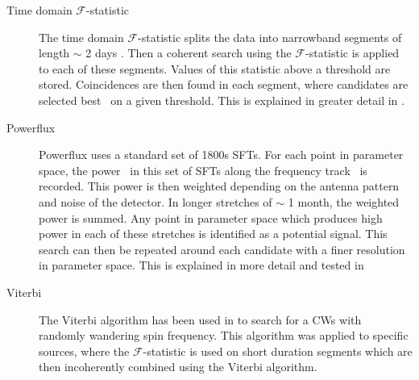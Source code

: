 \begin{description}
        \item[Time domain $\mathcal{F}$-statistic] The time domain
$\mathcal{F}$-statistic splits the data into narrowband segments of length
$\sim$ 2 days \citep{walsh2016ComparisonMethods}. Then a coherent search using
the $\mathcal{F}$-statistic is applied to each of these segments. Values of
this statistic above a threshold are stored. Coincidences are then found in
each segment, where candidates are selected best~ on a given
threshold. This is explained in greater detail in
\citep{aasi2014ImplementationTextdollar,walsh2016ComparisonMethods}.
	
        \item[Powerflux] Powerflux uses a standard set of 1800s \glspl{SFT}.
For each point in parameter space, the power~ in this set
of \glspl{SFT} along the frequency track~ is
recorded. This power is then weighted depending on the antenna pattern and
noise of the detector. In longer stretches of $\sim$ 1 month, the weighted
power is summed. Any point in parameter space which produces high power in each
of these stretches is identified as a potential signal. This search can then be
repeated around each candidate with a finer resolution in parameter space. This
is explained in more detail and tested in
\citep{abadie2012AllskySearch,walsh2016ComparisonMethods,ligoscientificcollaborationandvirgocollaboration2016ComprehensiveAllsky}
	
        \item[Viterbi] The Viterbi algorithm \citep{viterbi1967ErrorBounds} has
been used in \citep{sun2018HiddenMarkov,
suvorova2017HiddenMarkov,abbott2017SearchGravitational,
abbott2018SearchGravitational, sun2018ApplicationHidden} to search for a
\glspl{CW} with~ randomly wandering spin frequency. This
algorithm was applied to specific sources, where the $\mathcal{F}$-statistic is
used on short duration segments which are then incoherently combined using the
Viterbi algorithm.
	
\end{description}

